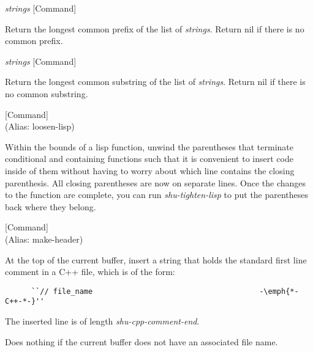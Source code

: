 \vspace{1em}
\noindent
{}
\usebox{\funcname}\emph{strings}
 \hfill [Command]

\begin{doc-string}
Return the longest common prefix of the list of \emph{strings}.  Return nil if there
is no common prefix.
\end{doc-string}

\vspace{1em}
\noindent
{}
\usebox{\funcname}\emph{strings}
 \hfill [Command]

\begin{doc-string}
Return the longest common substring of the list of \emph{strings}.  Return nil if
there is no common substring.
\end{doc-string}

\vspace{1em}
\noindent
{}
\usebox{\funcname}
 \hfill [Command]\\%
 (Alias: loosen-lisp)

\begin{doc-string}
Within the bounds of a lisp function, unwind the parentheses that terminate
conditional and containing functions such that it is convenient to insert code
inside of them without having to worry about which line contains the closing
parenthesis.  All closing parentheses are now on separate lines.  Once the
changes to the function are complete, you can run \emph{shu-tighten-lisp} to put the
parentheses back where they belong.
\end{doc-string}

\vspace{1em}
\noindent
{}
\usebox{\funcname}
 \hfill [Command]\\%
 (Alias: make-header)

\begin{doc-string}
At the top of the current buffer, insert a string that holds the standard
first line comment in a C++ file, which is of the form:

\small{\begin{verbatim}
      ``// file_name                                      -\emph{*-C++-*-}''
\end{verbatim}}

The inserted line is of length \emph{shu-cpp-comment-end}.

Does nothing if the current buffer does not have an associated file name.
\end{doc-string}

